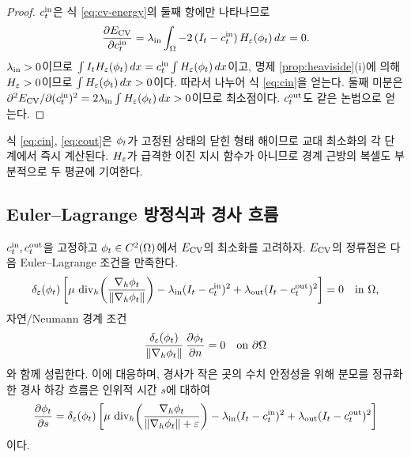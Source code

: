\begin{proof}
$c^{\mathrm{in}}_t$은 식 \eqref{eq:cv-energy}의 둘째 항에만 나타나므로
\[
  \frac{\partial E_{\mathrm{CV}}}{\partial c^{\mathrm{in}}_t}
  = \lambda_{\mathrm{in}} \int_\Omega -2\,(I_t - c^{\mathrm{in}}_t)\,H_\varepsilon(\phi_t)\,dx = 0.
\]
$\lambda_{\mathrm{in}}>0$이므로 $\int I_t H_\varepsilon(\phi_t)\,dx = c^{\mathrm{in}}_t \int H_\varepsilon(\phi_t)\,dx$이고,
명제 \ref{prop:heaviside}(i)에 의해 $H_\varepsilon>0$이므로 $\int H_\varepsilon(\phi_t)\,dx>0$이다.
따라서 나누어 식 \eqref{eq:cin}을 얻는다. 둘째 미분은
$\partial^2 E_{\mathrm{CV}}/\partial(c^{\mathrm{in}}_t)^2 = 2\lambda_{\mathrm{in}}\int H_\varepsilon(\phi_t)\,dx > 0$이므로 최소점이다.
$c^{\mathrm{out}}_t$도 같은 논법으로 얻는다.
\end{proof}

식 \eqref{eq:cin}, \eqref{eq:cout}은 $\phi_t$가 고정된 상태의 닫힌 형태 해이므로 교대
최소화의 각 단계에서 즉시 계산된다. $H_\varepsilon$가 급격한 이진 지시 함수가 아니므로
경계 근방의 복셀도 부분적으로 두 평균에 기여한다.

\subsection{Euler--Lagrange 방정식과 경사 흐름}

\begin{theorem}
\label{thm:gradient-flow}
$c^{\mathrm{in}}_t, c^{\mathrm{out}}_t$을 고정하고 $\phi_t \in C^2(\Omega)$에서 $E_{\mathrm{CV}}$의 최소화를 고려하자.
$E_{\mathrm{CV}}$의 정류점은 다음 Euler--Lagrange 조건을 만족한다.
\begin{equation}
  \delta_\varepsilon(\phi_t)\left[
    \mu\,\operatorname{div}_h\!\left(\frac{\nabla_h\phi_t}{\left\lVert \nabla_h\phi_t \right\rVert}\right)
    - \lambda_{\mathrm{in}} (I_t - c^{\mathrm{in}}_t)^2 + \lambda_{\mathrm{out}} (I_t - c^{\mathrm{out}}_t)^2
  \right] = 0
  \quad \text{in } \Omega,
  \label{eq:euler-lagrange}
\end{equation}
자연/Neumann 경계 조건
\begin{equation}
  \frac{\delta_\varepsilon(\phi_t)}{\left\lVert \nabla_h\phi_t \right\rVert}\,\frac{\partial \phi_t}{\partial n} = 0
  \quad \text{on } \partial\Omega
  \label{eq:neumann}
\end{equation}
와 함께 성립한다. 이에 대응하며, 경사가 작은 곳의 수치 안정성을 위해 분모를
정규화한 경사 하강 흐름은 인위적 시간 $s$에 대하여
\begin{equation}
  \frac{\partial \phi_t}{\partial s}
  = \delta_\varepsilon(\phi_t)\left[
    \mu\,\operatorname{div}_h\!\left(\frac{\nabla_h\phi_t}{\left\lVert \nabla_h\phi_t \right\rVert+\varepsilon}\right)
    - \lambda_{\mathrm{in}} (I_t - c^{\mathrm{in}}_t)^2 + \lambda_{\mathrm{out}} (I_t - c^{\mathrm{out}}_t)^2
  \right]
  \label{eq:gradient-flow}
\end{equation}
이다.
\end{theorem}

